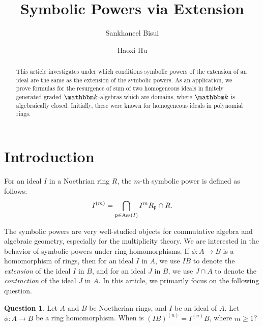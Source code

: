 \documentclass[12pt]{amsart}
\numberwithin{equation}{section}
\theoremstyle{definition}
\newtheorem{question}[theorem]{Question}
\DeclareMathOperator{\Ass}{Ass}
\newcommand{\kk}{{\mathbbm k}}
\def\pp{{\frak p}}
\begin{document}
	
	\title{Symbolic Powers via Extension}
	
	\author{Sankhaneel Bisui}
	\address{SRM University AP \\ Department of Mathematics \\
		Amaravati, AP 522502, India}
	
	\author{Haoxi Hu}
	\address{Tulane University, Department of Mathematics and Statistics,
		6823 St. Charles Avenue
		New Orleans, LA 70118, USA}
	
	
	
	
	
	\begin{abstract}
	This article investigates under which conditions symbolic powers of the extension of an ideal are the same as the extension of the symbolic powers. As an application, we prove formulas for the resurgence of sum of two homogeneous ideals in finitely generated graded $\kk$-algebras which are domains, where $\kk$ is algebraically closed. Initially, these were known for homogeneous ideals in polynomial rings. 
	\end{abstract}
	\maketitle
	\section{Introduction}
For an ideal $I$ in a Noethrian ring $R$, the $m$-th symbolic power is defined as follows: 
$$I^{(m)}=\bigcap_{\pp\in \Ass(I)} I^mR_\pp \cap R .$$ 

The symbolic powers are very well-studied objects for commutative algebra and algebraic geometry, especially for the multiplicity theory. We are interested in the behavior of symbolic powers under ring homomorphisms. If $\phi: A\to B$ is a homomorphism of rings, then for an ideal $I$ in $A$, we use $IB$ to denote the \emph{extension} of the ideal $I$ in $B$, and for an ideal $J$ in $B$, we use $J \cap A$ to denote the \emph{contraction} of the ideal $J$ in $A$. In this article, we primarily focus on the following question. 

\begin{question}\label{question: symbolic power extension}
	Let $A$ and $B$ be Noetherian rings, and $I$ be an ideal of $A$. Let $\phi: A\to B$ be a ring homomorphism. 
	When is $(IB)^{(n)} = I^{(n)}B$, where $m \geqslant 1$? %
\end{question}
\end{document}
